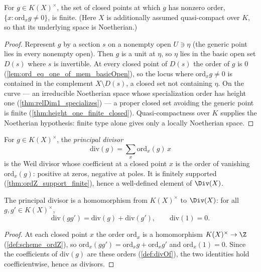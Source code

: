 \begin{theorem}
  \label{thm:ordZ_support_finite}
  \leanok
  For \(g \in K(X)^\times\), the set of closed points at which \(g\) has nonzero order,
  \(\{ x : \mathrm{ord}_x g \neq 0 \}\), is finite. (Here \(X\) is additionally assumed
  quasi-compact over \(K\), so that its underlying space is Noetherian.)
\end{theorem}
\begin{proof}
  \leanok
  Represent \(g\) by a section \(s\) on a nonempty open \(U \ni \eta\) (the generic point lies in
  every nonempty open). Then \(g\) is a unit at \(\eta\), so \(\eta\) lies in the basic open set
  \(D(s)\) where \(s\) is invertible. At every closed point of \(D(s)\) the order of \(g\) is \(0\)
  (\ref{lem:ord_eq_one_of_mem_basicOpen}), so the locus where \(\mathrm{ord}_x g \neq 0\) is
  contained in the complement \(X \setminus D(s)\), a closed set not containing \(\eta\). On the
  curve --- an irreducible Noetherian space whose specialization order has height one
  (\ref{thm:relDim1_specializes}) --- a proper closed set avoiding the generic point is finite
  (\ref{thm:height_one_finite_closed}). Quasi-compactness over \(K\) supplies the Noetherian
  hypothesis: finite type alone gives only a locally Noetherian space.
\end{proof}

\begin{definition}
  \label{def:divOf}
  \leanok
  For \(g \in K(X)^\times\), the \emph{principal divisor}
  \[
    \mathrm{div}(g) = \sum_{x} \mathrm{ord}_x(g)\, x
  \]
  is the Weil divisor whose coefficient at a closed point \(x\) is the order of vanishing
  \(\mathrm{ord}_x(g)\): positive at zeros, negative at poles. It is finitely supported
  (\ref{thm:ordZ_support_finite}), hence a well-defined element of \(\Div(X)\).
\end{definition}

\begin{theorem}
  \label{thm:divOf_hom}
  \leanok
  The principal divisor is a homomorphism from \(K(X)^\times\) to \(\Div(X)\): for all
  \(g, g' \in K(X)^\times\),
  \[
    \mathrm{div}(g g') = \mathrm{div}(g) + \mathrm{div}(g'), \qquad \mathrm{div}(1) = 0 .
  \]
\end{theorem}
\begin{proof}
  \leanok
  At each closed point \(x\) the order \(\mathrm{ord}_x\) is a homomorphism \(K(X)^\times \to \Z\)
  (\ref{def:scheme_ordZ}), so \(\mathrm{ord}_x(g g') = \mathrm{ord}_x g + \mathrm{ord}_x g'\) and
  \(\mathrm{ord}_x(1) = 0\). Since the coefficients of \(\mathrm{div}(g)\) are these orders
  (\ref{def:divOf}), the two identities hold coefficientwise, hence as divisors.
\end{proof}

